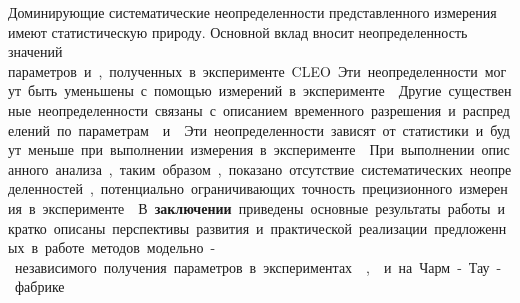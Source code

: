 Доминирующие систематические неопределенности представленного измерения имеют статистическую природу.  Основной вклад вносит неопределенность значений параметров~\ci и~\si, полученных в эксперименте~CLEO.  Эти неопределенности могут быть уменьшены с помощью измерений в эксперименте~\besiii.  Другие существенные неопределенности связаны с описанием временного разрешения и распределений по параметрам~\de и~\mbc.  Эти неопределенности зависят от статистики и будут меньше при выполнении измерения в эксперименте~\belleii.  При выполнении описанного анализа, таким образом, показано отсутствие систематических неопределенностей, потенциально ограничивающих точность прецизионного измерения в эксперименте~\belleii.

В {\textbf{заключении}} приведены основные результаты работы и кратко описаны перспективы развития и практической реализации предложенных в работе методов модельно-независимого получения параметров в экспериментах \belleii, \lhcb и на Чарм-Тау-фабрике.



{}

